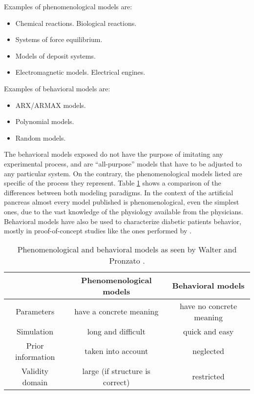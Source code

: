 Examples of phenomenological models are:
\begin{itemize}
	\item Chemical reactions. Biological reactions.
	\item Systems of force equilibrium.
	\item Models of deposit systems.
	\item Electromagnetic models. Electrical engines.
\end{itemize}
Examples of behavioral models are:
\begin{itemize}
	\item ARX/ARMAX models.
	\item Polynomial models.
	\item Random models.
\end{itemize}
The behavioral models exposed do not have the purpose of imitating any experimental process, and are ``all-purpose'' models that have to be adjusted to any particular system. On the contrary, the phenomenological models listed are specific of the process they represent. Table \ref{tab:PhenomenologicalAndBehavioralModels} shows a comparison of the differences between both modeling paradigms. In the context of the artificial pancreas almost every model published is phenomenological, even the simplest ones, due to the vast knowledge of the physiology available from the physicians. Behavioral models have also be used to characterize diabetic patients behavior, mostly in proof-of-concept studies like the ones performed by \cite{stahl2009diabetes}.
 
\begin{table}[hbtp]
	\centering
		\begin{tabular}{c|c|c}
		  &	Phenomenological models & Behavioral models \\
		 \hline 
		Parameters & have a concrete meaning & have no concrete meaning \\
		\hline 
		Simulation & long and difficult & quick and easy \\
		\hline 
		Prior information & taken into account & neglected \\
		\hline 
		Validity domain & large (if structure is correct) & restricted \\
		\end{tabular}
	\caption{Phenomenological and behavioral models as seen by Walter and Pronzato \cite{walter1997}.}
	\label{tab:PhenomenologicalAndBehavioralModels}
\end{table}

